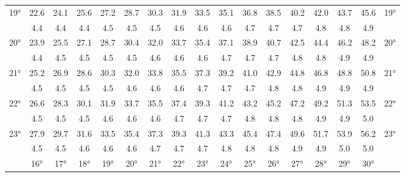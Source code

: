 \begin{footnotesize}
\begin{tabular}{c || c | c | c | c | c | c | c | c | c | c | c | c | c | c | c || c}
		\multirow{2}{*}{19°}&22.6&24.1&25.6&27.2&28.7&30.3&31.9&33.5&35.1&36.8&38.5&40.2&42.0&43.7&45.6&\multirow{2}{*}{19°}\\ \space&4.4&4.4&4.4&4.5&4.5&4.5&4.6&4.6&4.6&4.7&4.7&4.7&4.8&4.8&4.9&\space\\\hline
		\multirow{2}{*}{20°}&23.9&25.5&27.1&28.7&30.4&32.0&33.7&35.4&37.1&38.9&40.7&42.5&44.4&46.2&48.2&\multirow{2}{*}{20°}\\ \space&4.4&4.5&4.5&4.5&4.5&4.6&4.6&4.6&4.7&4.7&4.7&4.8&4.8&4.9&4.9&\space\\\hline
		\multirow{2}{*}{21°}&25.2&26.9&28.6&30.3&32.0&33.8&35.5&37.3&39.2&41.0&42.9&44.8&46.8&48.8&50.8&\multirow{2}{*}{21°}\\ \space&4.5&4.5&4.5&4.5&4.6&4.6&4.6&4.7&4.7&4.7&4.8&4.8&4.9&4.9&4.9&\space\\\hline
		\multirow{2}{*}{22°}&26.6&28.3&30.1&31.9&33.7&35.5&37.4&39.3&41.2&43.2&45.2&47.2&49.2&51.3&53.5&\multirow{2}{*}{22°}\\ \space&4.5&4.5&4.5&4.6&4.6&4.6&4.7&4.7&4.7&4.8&4.8&4.8&4.9&4.9&5.0&\space\\\hline
		\multirow{2}{*}{23°}&27.9&29.7&31.6&33.5&35.4&37.3&39.3&41.3&43.3&45.4&47.4&49.6&51.7&53.9&56.2&\multirow{2}{*}{23°}\\ \space&4.5&4.5&4.6&4.6&4.6&4.7&4.7&4.7&4.8&4.8&4.8&4.9&4.9&5.0&5.0&\space\\\hline
		\hline\space &16°&17°&18°&19°&20°&21°&22°&23°&24°&25°&26°&27°&28°&29°&30°
\end{tabular}\end{footnotesize}

